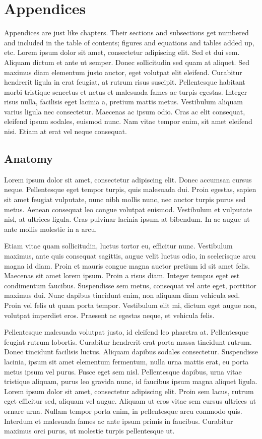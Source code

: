 \chapter{\label{app:1-cardiophys}Appendices}

Appendices are just like chapters.  Their sections and subsections get numbered and included in the table of contents; figures and equations and tables added up, etc.  Lorem ipsum dolor sit amet, consectetur adipiscing elit. Sed et dui sem. Aliquam dictum et ante ut semper. Donec sollicitudin sed quam at aliquet. Sed maximus diam elementum justo auctor, eget volutpat elit eleifend. Curabitur hendrerit ligula in erat feugiat, at rutrum risus suscipit. Pellentesque habitant morbi tristique senectus et netus et malesuada fames ac turpis egestas. Integer risus nulla, facilisis eget lacinia a, pretium mattis metus. Vestibulum aliquam varius ligula nec consectetur. Maecenas ac ipsum odio. Cras ac elit consequat, eleifend ipsum sodales, euismod nunc. Nam vitae tempor enim, sit amet eleifend nisi. Etiam at erat vel neque consequat.

\section{Anatomy}
\label{sec:anatomy}

Lorem ipsum dolor sit amet, consectetur adipiscing elit. Donec accumsan cursus neque. Pellentesque eget tempor turpis, quis malesuada dui. Proin egestas, sapien sit amet feugiat vulputate, nunc nibh mollis nunc, nec auctor turpis purus sed metus. Aenean consequat leo congue volutpat euismod. Vestibulum et vulputate nisl, at ultrices ligula. Cras pulvinar lacinia ipsum at bibendum. In ac augue ut ante mollis molestie in a arcu.

Etiam vitae quam sollicitudin, luctus tortor eu, efficitur nunc. Vestibulum maximus, ante quis consequat sagittis, augue velit luctus odio, in scelerisque arcu magna id diam. Proin et mauris congue magna auctor pretium id sit amet felis. Maecenas sit amet lorem ipsum. Proin a risus diam. Integer tempus eget est condimentum faucibus. Suspendisse sem metus, consequat vel ante eget, porttitor maximus dui. Nunc dapibus tincidunt enim, non aliquam diam vehicula sed. Proin vel felis ut quam porta tempor. Vestibulum elit mi, dictum eget augue non, volutpat imperdiet eros. Praesent ac egestas neque, et vehicula felis.

Pellentesque malesuada volutpat justo, id eleifend leo pharetra at. Pellentesque feugiat rutrum lobortis. Curabitur hendrerit erat porta massa tincidunt rutrum. Donec tincidunt facilisis luctus. Aliquam dapibus sodales consectetur. Suspendisse lacinia, ipsum sit amet elementum fermentum, nulla urna mattis erat, eu porta metus ipsum vel purus. Fusce eget sem nisl. Pellentesque dapibus, urna vitae tristique aliquam, purus leo gravida nunc, id faucibus ipsum magna aliquet ligula. Lorem ipsum dolor sit amet, consectetur adipiscing elit. Proin sem lacus, rutrum eget efficitur sed, aliquam vel augue. Aliquam ut eros vitae sem cursus ultrices ut ornare urna. Nullam tempor porta enim, in pellentesque arcu commodo quis. Interdum et malesuada fames ac ante ipsum primis in faucibus. Curabitur maximus orci purus, ut molestie turpis pellentesque ut.

